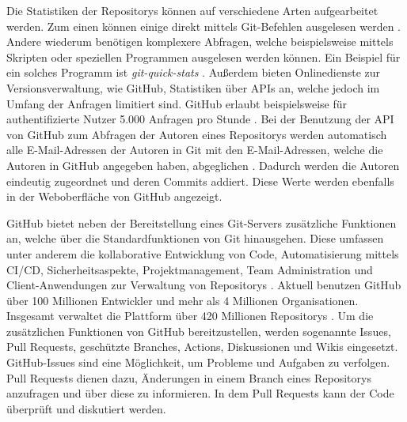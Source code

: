 Die Statistiken der Repositorys können auf verschiedene Arten aufgearbeitet werden.
Zum einen können einige direkt mittels Git-Befehlen ausgelesen werden \autocite{chacon_git_2024}.
Andere wiederum benötigen komplexere Abfragen, welche beispielsweise mittels Skripten oder speziellen Programmen ausgelesen werden können.
Ein Beispiel für ein solches Programm ist \emph{git-quick-stats} \autocite{mestan_git-quick-stats_2024}.
Außerdem bieten Onlinedienste zur Versionsverwaltung, wie GitHub, Statistiken über APIs an, welche jedoch im Umfang der Anfragen limitiert sind.
GitHub erlaubt beispielsweise für authentifizierte Nutzer 5.000 Anfragen pro Stunde \autocite{github_rate_2022}.
Bei der Benutzung der API von GitHub zum Abfragen der Autoren eines Repositorys werden automatisch alle E-Mail-Adressen der Autoren in Git mit den E-Mail-Adressen, welche die Autoren in GitHub angegeben haben, abgeglichen \autocite{github_rest-api-endpunkte_2022}.
Dadurch werden die Autoren eindeutig zugeordnet und deren Commits addiert.
Diese Werte werden ebenfalls in der Weboberfläche von GitHub angezeigt.

GitHub bietet neben der Bereitstellung eines Git-Servers zusätzliche Funktionen an, welche über die Standardfunktionen von Git hinausgehen.
Diese umfassen unter anderem die kollaborative Entwicklung von Code, Automatisierung mittels CI/CD, Sicherheitsaspekte, Projektmanagement, Team Administration und Client-Anwendungen zur Verwaltung von Repositorys \autocite{ponuthorai_version_2022}.
Aktuell benutzen GitHub über 100 Millionen Entwickler und mehr als 4 Millionen Organisationen.
Insgesamt verwaltet die Plattform über 420 Millionen Repositorys \autocite{github_about_2024}.
Um die zusätzlichen Funktionen von GitHub bereitzustellen, werden sogenannte Issues, Pull Requests, geschützte Branches, Actions, Diskussionen und Wikis eingesetzt.
GitHub-Issues sind eine Möglichkeit, um Probleme und Aufgaben zu verfolgen.
Pull Requests dienen dazu, Änderungen in einem Branch eines Repositorys anzufragen und über diese zu informieren.
In dem Pull Requests kann der Code überprüft und diskutiert werden.
